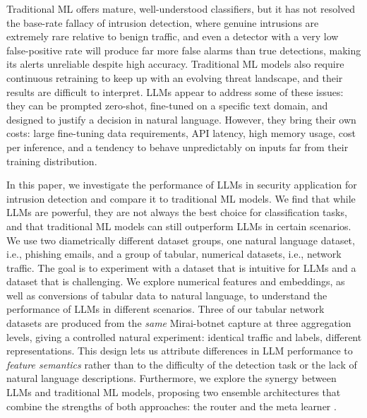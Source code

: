 \documentclass{jmlr}
\begin{document}
Traditional ML offers mature, well-understood classifiers, but it has not resolved the base-rate
fallacy of intrusion detection, where genuine intrusions are extremely rare relative to benign traffic, and even a detector with a very low false-positive rate will produce far more false alarms than true detections, making its alerts unreliable despite high accuracy. Traditional ML models also require continuous retraining to keep up with an evolving threat landscape, and their results are difficult to interpret. LLMs appear to address some of these issues: they can be prompted zero-shot, fine-tuned on a specific text domain, and designed to justify a decision in natural language. However, they bring their own costs: large fine-tuning data requirements, API latency, high memory usage, cost per inference, and a tendency to behave unpredictably on inputs far from their training distribution. 

In this paper, we investigate the performance of LLMs in security application for intrusion detection and compare it to traditional ML models. We find that while LLMs are powerful, they are not always the best choice for classification tasks, and that traditional ML models can still outperform LLMs in certain scenarios. We use two diametrically different dataset groups, one natural language dataset, i.e., phishing emails, and a group of tabular, numerical datasets, i.e., network traffic. The goal is to experiment with a dataset that is intuitive for LLMs and a dataset that is challenging. We explore numerical features and embeddings, as well as conversions of tabular data to natural language, to understand the performance of LLMs in different scenarios. Three of our tabular network datasets are produced from the \textit{same} Mirai-botnet capture \citep{mirsky2018kitsune}
at three aggregation levels, giving a controlled natural experiment: identical traffic and labels, different representations. This design
lets us attribute differences in LLM performance to \textit{feature semantics} rather than to the difficulty
of the detection task or the lack of natural language descriptions. Furthermore, we explore the synergy between LLMs and traditional ML models, proposing two ensemble architectures that combine the strengths of both approaches: the router \citep{jacobs1991adaptive,ong2024routellm} and the meta learner \citep{wolpert1992stacked}.
\end{document}
